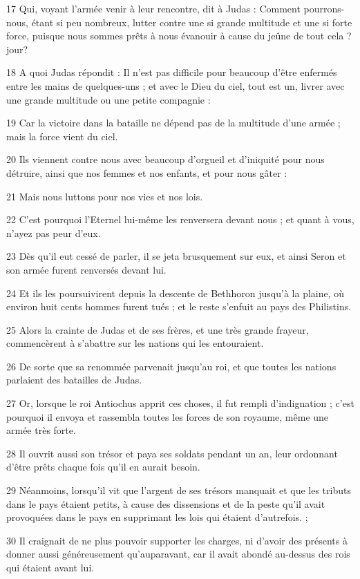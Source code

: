 \par 17 Qui, voyant l'armée venir à leur rencontre, dit à Judas : Comment pourrons-nous, étant si peu nombreux, lutter contre une si grande multitude et une si forte force, puisque nous sommes prêts à nous évanouir à cause du jeûne de tout cela ? jour?
\par 18 A quoi Judas répondit : Il n'est pas difficile pour beaucoup d'être enfermés entre les mains de quelques-uns ; et avec le Dieu du ciel, tout est un, livrer avec une grande multitude ou une petite compagnie :
\par 19 Car la victoire dans la bataille ne dépend pas de la multitude d'une armée ; mais la force vient du ciel.
\par 20 Ils viennent contre nous avec beaucoup d'orgueil et d'iniquité pour nous détruire, ainsi que nos femmes et nos enfants, et pour nous gâter :
\par 21 Mais nous luttons pour nos vies et nos lois.
\par 22 C'est pourquoi l'Eternel lui-même les renversera devant nous ; et quant à vous, n'ayez pas peur d'eux.
\par 23 Dès qu'il eut cessé de parler, il se jeta brusquement sur eux, et ainsi Seron et son armée furent renversés devant lui.
\par 24 Et ils les poursuivirent depuis la descente de Bethhoron jusqu'à la plaine, où environ huit cents hommes furent tués ; et le reste s'enfuit au pays des Philistins.
\par 25 Alors la crainte de Judas et de ses frères, et une très grande frayeur, commencèrent à s'abattre sur les nations qui les entouraient.
\par 26 De sorte que sa renommée parvenait jusqu'au roi, et que toutes les nations parlaient des batailles de Judas.
\par 27 Or, lorsque le roi Antiochus apprit ces choses, il fut rempli d'indignation ; c'est pourquoi il envoya et rassembla toutes les forces de son royaume, même une armée très forte.
\par 28 Il ouvrit aussi son trésor et paya ses soldats pendant un an, leur ordonnant d'être prêts chaque fois qu'il en aurait besoin.
\par 29 Néanmoins, lorsqu'il vit que l'argent de ses trésors manquait et que les tributs dans le pays étaient petits, à cause des dissensions et de la peste qu'il avait provoquées dans le pays en supprimant les lois qui étaient d'autrefois. ;
\par 30 Il craignait de ne plus pouvoir supporter les charges, ni d'avoir des présents à donner aussi généreusement qu'auparavant, car il avait abondé au-dessus des rois qui étaient avant lui.
